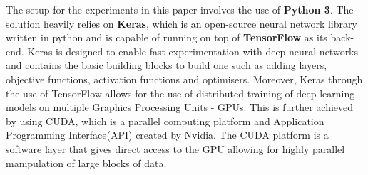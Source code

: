 The setup for the experiments in this paper involves the use of \textbf{Python 3}. The solution heavily relies on \textbf{Keras}, which is an open-source neural network library written in python and is capable of running on top of \textbf{TensorFlow} as its back-end. Keras is designed to enable fast experimentation with deep neural networks and contains the basic building blocks to build one such as adding layers, objective functions, activation functions and optimisers. Moreover, Keras through the use of TensorFlow allows for the use of distributed training of deep learning models on multiple Graphics Processing Units - GPUs. This is further achieved by using CUDA, which is a parallel computing platform and Application Programming Interface(API) created by Nvidia. 
The CUDA platform is a software layer that gives direct access to the GPU allowing for highly parallel manipulation of large blocks of data.



